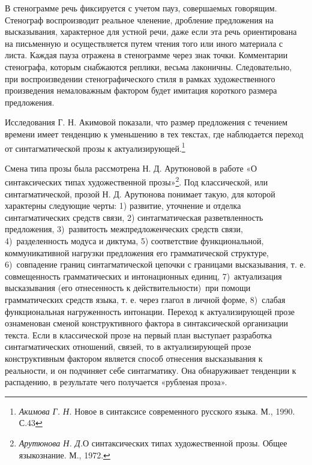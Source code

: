 \documentclass{kursa4}
\begin{document}
{      В стенограмме речь фиксируется с учетом пауз, совершаемых говорящим. Стенограф воспроизводит реальное членение, дробление предложения на высказывания, характерное для устной речи, даже если эта речь ориентирована на письменную и осуществляется путем чтения того или иного материала с листа. Каждая пауза отражена в стенограмме через знак точки. Комментарии стенографа, которым снабжаются реплики, весьма лаконичны. Следовательно, при воспроизведении стенографического стиля в рамках художественного произведения немаловажным фактором будет имитация короткого размера предложения. 

      Исследования Г. Н. Акимовой показали, что размер предложения с течением времени имеет тенденцию к уменьшению в тех текстах, где наблюдается переход от синтагматической прозы к актуализирующей.\footnote{\textit{Акимова Г. Н.} Новое в синтаксисе современного русского языка. М., 1990. С.43} 

      Смена типа прозы была рассмотрена Н. Д. Арутюновой в работе «О синтаксических типах художественной прозы»\footnote{\textit{Арутюнова Н. Д.}О синтаксических типах художественной прозы. Общее языкознание. М., 1972.}. Под классической, или синтагматической, прозой Н. Д. Арутюнова понимает такую, для которой характерны следующие черты: 1) развитие, уточнение и отделка синтагматических средств связи, 2) синтагматическая разветвленность предложения, 3)~развитость межпредложенческих средств связи, 4)~разделенность модуса и диктума, 5) соответствие функциональной, коммуникативной нагрузки предложения его грамматической структуре, 6)~совпадение границ синтагматической цепочки с границами высказывания, т. е. совмещенность грамматических и интонационных единиц, 7)~актуализация высказывания (его отнесенность к действительности)~при помощи грамматических средств языка, т. е. через глагол в личной форме, 8)~слабая функциональная нагруженность интонации. Переход к актуализирующей прозе ознаменован сменой конструктивного фактора в синтаксической организации текста. Если в классической прозе на первый план выступает разработка синтагматических отношений, связей, то в актуализирующей прозе конструктивным фактором является способ отнесения высказывания к реальности, и он подчиняет себе синтагматику. Она обнаруживает тенденции к распадению, в результате чего получается «рубленая проза». 

}
\end{document}

